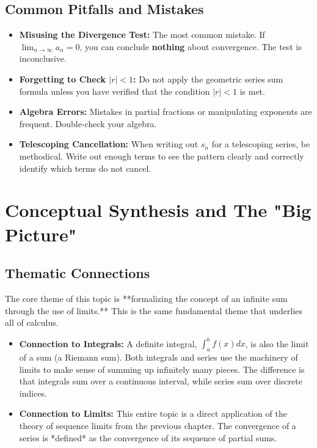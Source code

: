 \documentclass{article}
\begin{document}
\subsection{Common Pitfalls and Mistakes}
\begin{itemize}
    \item \textbf{Misusing the Divergence Test:} The most common mistake. If $\lim_{n \to \infty} a_n = 0$, you can conclude \textbf{nothing} about convergence. The test is inconclusive.
    \item \textbf{Forgetting to Check $|r| < 1$:} Do not apply the geometric series sum formula unless you have verified that the condition $|r| < 1$ is met.
    \item \textbf{Algebra Errors:} Mistakes in partial fractions or manipulating exponents are frequent. Double-check your algebra.
    \item \textbf{Telescoping Cancellation:} When writing out $s_n$ for a telescoping series, be methodical. Write out enough terms to see the pattern clearly and correctly identify which terms do not cancel.
\end{itemize}

\section{Conceptual Synthesis and The "Big Picture"}
\subsection{Thematic Connections}
The core theme of this topic is **formalizing the concept of an infinite sum through the use of limits.** This is the same fundamental theme that underlies all of calculus.
\begin{itemize}
    \item \textbf{Connection to Integrals:} A definite integral, $\int_a^b f(x) dx$, is also the limit of a sum (a Riemann sum). Both integrals and series use the machinery of limits to make sense of summing up infinitely many pieces. The difference is that integrals sum over a continuous interval, while series sum over discrete indices.
    \item \textbf{Connection to Limits:} This entire topic is a direct application of the theory of sequence limits from the previous chapter. The convergence of a series is *defined* as the convergence of its sequence of partial sums.
\end{itemize}
\end{document}
